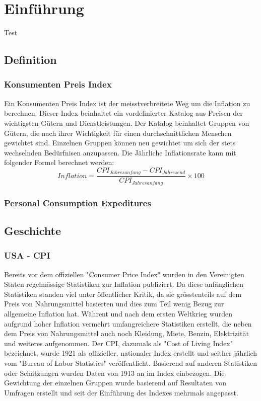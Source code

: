 \section{Einführung}
Test\autocite{HUNDRET-YEARS-CPI}

\subsection{Definition}

\subsubsection{Konsumenten Preis Index}


Ein Konsumenten Preis Index ist der meisstverbreitete Weg um die Inflation zu berechnen.
Dieser Index beinhaltet ein vordefinierter Katalog aus Preisen der wichtigsten Gütern und Dienstleistungen.
Der Katalog beinhaltet Gruppen von Gütern, die nach ihrer Wichtigkeit für einen durchschnittlichen Menschen gewichtet sind.
Einzelnen Gruppen können neu gewichtet um sich der stets wechselnden Bedürfnisen anzupassen.
Die Jährliche Inflationsrate kann mit folgender Formel berechnet werden:
$$Inflation = \frac{CPI_{Jahresanfang} - CPI_{Jahresend}}{CPI_{Jahresanfang}} \times 100$$

\subsubsection{Personal Consumption Expeditures}

\subsection{Geschichte}

\subsubsection{USA - CPI}
Bereits vor dem offiziellen "Consumer Price Index" wurden in den Vereinigten Staten regelmässige Statistiken zur Inflation publiziert.
Da diese anfänglichen Statistiken standen viel unter öffentlicher Kritik,
da sie grösstenteils auf dem Preis von Nahrungsmittel basierten und dies zum Teil wenig Bezug zur allgemeine Inflation hat.
Währent und nach dem ersten Weltkrieg wurden aufgrund hoher Inflation vermehrt umfangreichere Statistiken erstellt, die neben dem Preis von Nahrungsmittel auch noch Kleidung, Miete, Benzin, Elektrizität und weiteres aufgenommen.
Der CPI, dazumals als "Cost of Living Index" bezeichnet, wurde 1921 als offizieller, nationaler Index erstellt und seither jährlich vom "Bureau of Labor Statistics" veröffentlicht.
Basierend auf anderen Statistiken oder Schätzungen wurden Daten von 1913 an im Index einbezogen.
Die Gewichtung der einzelnen Gruppen wurde basierend auf Resultaten von Umfragen erstellt und seit der Einführung des Indexes mehrmals angepasst.

